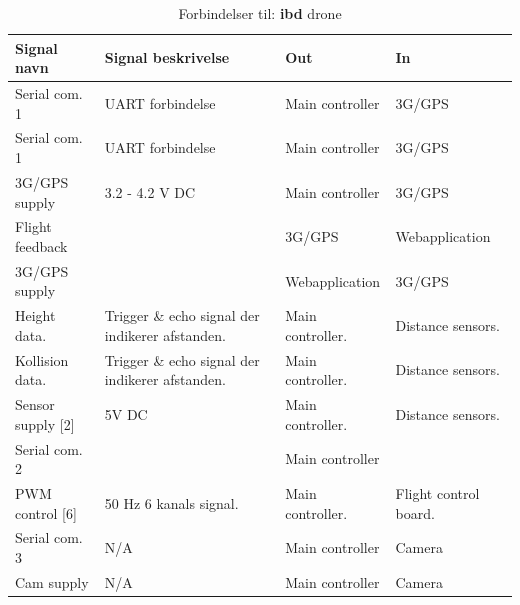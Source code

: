 \begin{table}[H]
	\centering
		\begin{tabular}{|p{2.5 cm}|p{5.5 cm}|p{2.5 cm}|p{2.5 cm}|} 
		\hline
			\textbf{Signal navn} 	& \textbf{Signal beskrivelse}		& \textbf{Out} 				& \textbf{In}     \\ \hline
			Serial com. 1		& UART forbindelse & Main controller & 3G/GPS    \\ \hline
			Serial com. 1		& UART forbindelse & Main controller & 3G/GPS    \\ \hline
			3G/GPS supply 		& 3.2 - 4.2 V DC	& Main controller				& 3G/GPS	\\ \hline
			Flight feedback	& & 3G/GPS	& Webapplication	\\ \hline
			
			3G/GPS supply 		& 	& Webapplication				& 3G/GPS	\\ \hline
			Height data.		& Trigger \& echo signal der indikerer afstanden. 	& Main controller.	& Distance sensors.	\\ \hline
			Kollision data.		& Trigger \& echo signal der indikerer afstanden. 	& Main controller.	& Distance sensors.  \\ \hline
			Sensor supply [2]	& 5V DC	& Main controller. & Distance sensors.	\\ \hline
			Serial com. 2		& 	& Main controller				& 	\\ \hline 
			PWM control [6]		& 50 Hz 6 kanals signal.	& Main controller.				& Flight control board.	\\ \hline
			Serial com. 3		& N/A	& Main controller	& Camera	\\ \hline
			Cam supply			& N/A 	& Main controller	& Camera	\\ \hline 
		\end{tabular}
	\caption{Forbindelser til: \textbf{ibd} drone}
	\label{tab:ibddrone}
\end{table}

